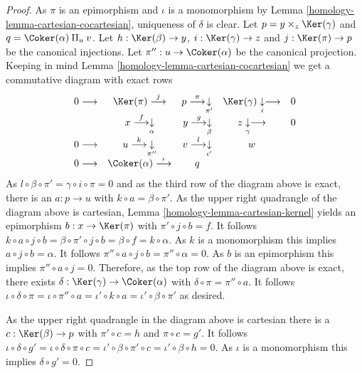 \begin{proof}

As $\pi$ is an epimorphism and $\iota$ is a monomorphism by
Lemma \ref{homology-lemma-cartesian-cocartesian}, uniqueness of $\delta$ is clear.
Let $p = y \times_z \Ker(\gamma)$ and $q = \Coker(\alpha) \amalg_u v$.
Let $h : \Ker(\beta) \to y$, $i : \Ker(\gamma) \to z$ and
$j : \Ker(\pi) \to p$ be the canonical injections.
Let $\pi'' : u \to \Coker(\alpha)$ be the canonical projection.
Keeping in mind Lemma \ref{homology-lemma-cartesian-cocartesian} we get a commutative
diagram with exact rows
$$
\begin{array}{ccccc}0 \longrightarrow & \Ker(\pi) \overset{j}{\longrightarrow} & p \overset{\pi}{\longrightarrow}\underset{\pi'}{\downarrow} & \Ker(\gamma) \underset{i}{\downarrow}\longrightarrow & 0 \\  & x \overset{f}{\longrightarrow}\underset{\alpha}{\downarrow} & y \overset{g}{\longrightarrow}\underset{\beta}{\downarrow} & z \underset{\gamma}{\downarrow}\longrightarrow & 0 \\ 0 \longrightarrow & u \overset{k}{\longrightarrow}\underset{\pi''}{\downarrow} & v \overset{l}{\longrightarrow}\underset{\iota'}{\downarrow} & w &  \\ 0 \longrightarrow & \Coker(\alpha) \overset{\iota}{\longrightarrow} & q &  & \end{array}
$$
As $l \circ \beta \circ \pi' = \gamma \circ i \circ \pi = 0$ and as the third
row of the diagram above is exact, there is an $a : p \to u$
with $k \circ a = \beta \circ \pi'$. As the upper right quadrangle of the
diagram above is cartesian, Lemma \ref{homology-lemma-cartesian-kernel} yields an
epimorphism $b : x \to \Ker(\pi)$ with $\pi' \circ j \circ b = f$.
It follows
$k \circ a \circ j \circ b = \beta \circ \pi' \circ j \circ b =
\beta \circ f = k \circ \alpha$.
As $k$ is a monomorphism this implies $a \circ j \circ b = \alpha$. It follows
$\pi'' \circ a \circ j \circ b = \pi'' \circ \alpha = 0$. As $b$ is an
epimorphism this
implies $\pi'' \circ a \circ j = 0$. Therefore, as the top row of the diagram
above is exact, there exists
$\delta : \Ker(\gamma) \to \Coker(\alpha)$ with
$\delta \circ \pi = \pi'' \circ a$. It follows
$\iota \circ \delta \circ \pi = \iota \circ \pi'' \circ a =
\iota' \circ k \circ a = \iota' \circ \beta \circ \pi'$
as desired.

\medskip\noindent
As the upper right quadrangle in the diagram above is cartesian there
is a $c : \Ker(\beta) \to p$ with $\pi' \circ c = h$ and $\pi \circ c = g'$.
It follows
$\iota \circ \delta \circ g' = \iota \circ \delta \circ \pi \circ c =
\iota' \circ \beta \circ \pi' \circ c = \iota' \circ \beta \circ h = 0$.
As $\iota$ is a monomorphism this implies $\delta \circ g' = 0$.


\end{proof}
